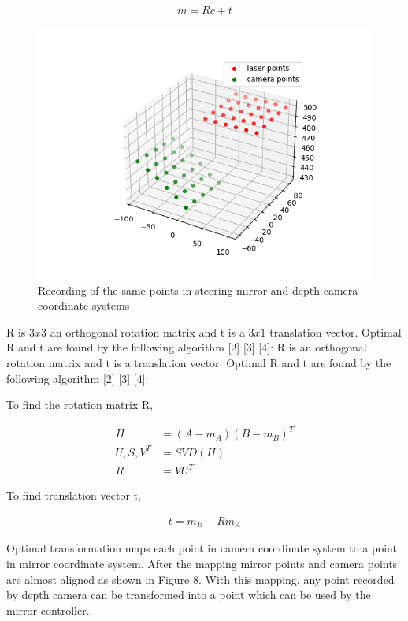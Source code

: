 \begin{align*}
    m = R c + t
\end{align*}


\begin{figure}[!htb]\centering
    \includegraphics*[width = 16cm]{bilder/project/mapping1.png}
    \caption{Recording of the same points in steering mirror and depth camera coordinate systems }
    \label{fig:mapping1}
\end{figure}


R is $3x3$ an orthogonal rotation matrix and t is a $3x1$ translation
vector. Optimal R and t are found by the following algorithm [2] [3] [4]:
R is an orthogonal rotation matrix and t is a translation vector.
Optimal R and t are found by the following algorithm [2] [3] [4]:


To find the rotation matrix R,

\begin{align*}
    H           & = (A-m_{A})(B-m_{B})^{T} \\
    U, S, V^{T} & = SVD(H)                 \\
    R           & = VU^{T}
\end{align*}


To find translation vector t,

\begin{align*}
    t = m_{B} - R m_{A}
\end{align*}



Optimal transformation maps each point in camera coordinate
system to a point in mirror coordinate system. After the
mapping mirror points and camera points are almost aligned
as shown in Figure 8. With this mapping, any point recorded
by depth camera can be transformed into a point which can be
used by the mirror controller.


